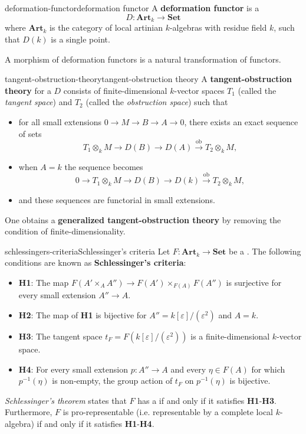 \begin{topic}{deformation-functor}{deformation functor}
    A \textbf{deformation functor} is a 
    \[ D : \textbf{Art}_k \to \textbf{Set} \]
    where $\textbf{Art}_k$ is the category of local artinian $k$-algebras with residue field $k$, such that $D(k)$ is a single point.
    
    A morphism of deformation functors is a natural transformation of functors.
\end{topic}

\begin{topic}{tangent-obstruction-theory}{tangent-obstruction theory}
    A \textbf{tangent-obstruction theory} for a  $D$ consists of finite-dimensional $k$-vector spaces $T_1$ (called the \textit{tangent space}) and $T_2$ (called the \textit{obstruction space}) such that
    \begin{itemize}
        \item for all small extensions $0 \to M \to B \to A \to 0$, there exists an exact sequence of sets
        \[ T_1 \otimes_k M \to D(B) \to D(A) \xrightarrow{\text{ob}} T_2 \otimes_k M , \]
        \item when $A = k$ the sequence becomes
        \[ 0 \to T_1 \otimes_k M \to D(B) \to D(k) \xrightarrow{\text{ob}} T_2 \otimes_k M , \]
        \item and these sequences are functorial in small extensions.
    \end{itemize}
    
    One obtains a \textbf{generalized tangent-obstruction theory} by removing the condition of finite-dimensionality.
\end{topic}

\begin{topic}{schlessingers-criteria}{Schlessinger's criteria}
    Let $F : \textbf{Art}_k \to \textbf{Set}$ be a . The following conditions are known as \textbf{Schlessinger's criteria}:
    \begin{itemize}
        \item \textbf{H1}: The map $F(A' \times_A A'') \to F(A') \times_{F(A)} F(A'')$ is surjective for every small extension $A'' \to A$.
        \item \textbf{H2}: The map of \textbf{H1} is bijective for $A'' = k[\varepsilon] / (\varepsilon^2)$ and $A = k$.
        \item \textbf{H3}: The tangent space $t_F = F(k[\varepsilon]/(\varepsilon^2))$ is a finite-dimensional $k$-vector space.
        \item \textbf{H4}: For every small extension $p : A'' \to A$ and every $\eta \in F(A)$ for which $p^{-1}(\eta)$ is non-empty, the group action of $t_F$ on $p^{-1}(\eta)$ is bijective.
    \end{itemize}
    \textit{Schlessinger's theorem} states that $F$ has a  if and only if it satisfies \textbf{H1}-\textbf{H3}. Furthermore, $F$ is pro-representable (i.e. representable by a complete local $k$-algebra) if and only if it satisfies \textbf{H1}-\textbf{H4}.
\end{topic}

